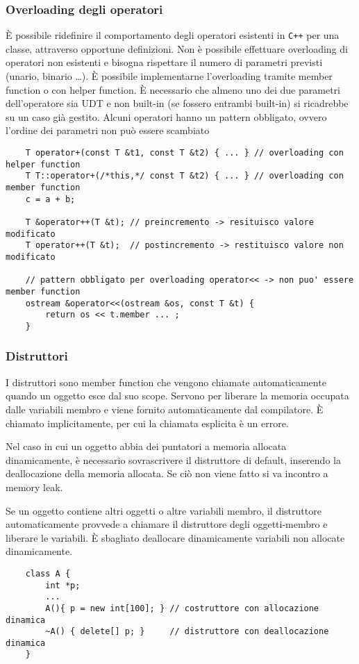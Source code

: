 \documentclass[a4paper]{article}
\begin{document}
\subsubsection*{Overloading degli operatori}
È possibile ridefinire il comportamento degli operatori esistenti in \verb|C++| per una classe, attraverso opportune definizioni. Non
è possibile effettuare overloading di operatori non esistenti e bisogna rispettare il numero di parametri previsti (unario,
binario \dots). È possibile implementarne l'overloading tramite member function o con helper function. È necessario che almeno
uno dei due parametri dell'operatore sia UDT e non  built-in (se fossero entrambi built-in) si ricadrebbe su un caso già gestito.
Alcuni operatori hanno un pattern obbligato, ovvero l'ordine dei parametri non può essere scambiato
\begin{lstlisting}
	T operator+(const T &t1, const T &t2) { ... } // overloading con helper function
	T T::operator+(/*this,*/ const T &t2) { ... } // overloading con member function
	c = a + b;

	T &operator++(T &t); // preincremento -> resituisco valore modificato
	T operator++(T &t);  // postincremento -> restituisco valore non modificato

	// pattern obbligato per overloading operator<< -> non puo' essere member function
	ostream &operator<<(ostream &os, const T &t) {
		return os << t.member ... ;
	}
\end{lstlisting}

\subsubsection*{Distruttori}
I distruttori sono member function che vengono chiamate automaticamente quando un oggetto esce dal suo scope. Servono per liberare
la memoria occupata dalle variabili membro e viene fornito automaticamente dal compilatore. È chiamato implicitamente, per cui
la chiamata esplicita è un errore.

Nel caso in cui un oggetto abbia dei puntatori a memoria allocata dinamicamente, è necessario sovrascrivere il distruttore di
default, inserendo la deallocazione della memoria allocata. Se ciò non viene fatto si va incontro a memory leak.

Se un oggetto contiene altri oggetti o altre variabili membro, il distruttore automaticamente provvede a chiamare il distruttore
degli oggetti-membro e liberare le variabili. È sbagliato deallocare dinamicamente variabili non allocate dinamicamente.
\begin{lstlisting}
	class A {
		int *p;
		...
		A(){ p = new int[100]; } // costruttore con allocazione dinamica
		~A() { delete[] p; }     // distruttore con deallocazione dinamica
	}
\end{lstlisting}
\end{document}
